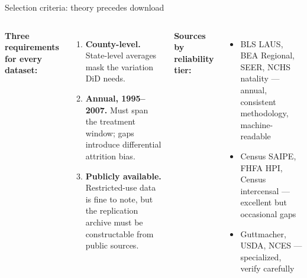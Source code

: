 \documentclass[aspectratio=169,12pt]{beamer}
\begin{document}

\begin{frame}{Selection criteria: theory precedes download}

\vspace{0.3em}
\begin{columns}[t]
  \textbf{\color{ArnoBlue}Three requirements for every dataset:}
  \begin{enumerate}\small
    \item \textbf{County-level.} State-level averages mask the variation DiD needs.
    \item \textbf{Annual, 1995--2007.} Must span the treatment window; gaps introduce
          differential attrition bias.
    \item \textbf{Publicly available.} Restricted-use data is fine to note, but the
          replication archive must be constructable from public sources.
  \end{enumerate}

  \textbf{\color{Terracotta}Sources by reliability tier:}
  \begin{itemize}\small
    \item[\textcolor{CypressGreen}{A}] BLS LAUS, BEA Regional, SEER, NCHS natality
         --- annual, consistent methodology, machine-readable
    \item[\textcolor{TuscanGold}{B}] Census SAIPE, FHFA HPI, Census intercensal
         --- excellent but occasional gaps
    \item[\textcolor{OldMortar}{C}] Guttmacher, USDA, NCES
         --- specialized, verify carefully
  \end{itemize}
\end{columns}

\end{frame}
\end{document}

